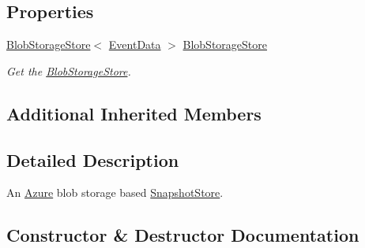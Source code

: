 \subsection*{Properties}
\begin{DoxyCompactItemize}
\item 
\hyperlink{classCqrs_1_1Azure_1_1BlobStorage_1_1BlobStorageStore}{Blob\+Storage\+Store}$<$ \hyperlink{classCqrs_1_1Events_1_1EventData}{Event\+Data} $>$ \hyperlink{classCqrs_1_1Azure_1_1BlobStorage_1_1Events_1_1BlobStorageSnapshotStore_abae8311ccc1869443861c434f4090549_abae8311ccc1869443861c434f4090549}{Blob\+Storage\+Store}
\begin{DoxyCompactList}\small\item\em Get the \hyperlink{classCqrs_1_1Azure_1_1BlobStorage_1_1BlobStorageStore}{Blob\+Storage\+Store}. \end{DoxyCompactList}\end{DoxyCompactItemize}
\subsection*{Additional Inherited Members}


\subsection{Detailed Description}
An \hyperlink{namespaceCqrs_1_1Azure}{Azure} blob storage based \hyperlink{classCqrs_1_1Snapshots_1_1SnapshotStore_aa8ab186f864443c7d9647a4522864a84_aa8ab186f864443c7d9647a4522864a84}{Snapshot\+Store}. 



\subsection{Constructor \& Destructor Documentation}
\mbox{\label{classCqrs_1_1Azure_1_1BlobStorage_1_1Events_1_1BlobStorageSnapshotStore_ac0e7a4428f17d4734de77261d1c6669d_ac0e7a4428f17d4734de77261d1c6669d}} 
